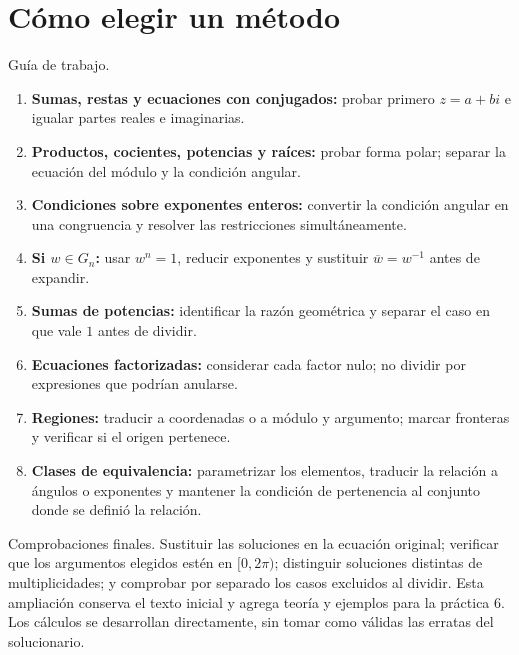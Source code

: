 \section{Cómo elegir un método}
\begin{nota}{Guía de trabajo.}
\begin{enumerate}
\item \textbf{Sumas, restas y ecuaciones con conjugados:} probar primero
$z=a+bi$ e igualar partes reales e imaginarias.
\item \textbf{Productos, cocientes, potencias y raíces:} probar forma polar;
separar la ecuación del módulo y la condición angular.
\item \textbf{Condiciones sobre exponentes enteros:} convertir la condición
angular en una congruencia y resolver las restricciones simultáneamente.
\item \textbf{Si $w\in G_n$:} usar $w^n=1$, reducir exponentes y sustituir
$\overline w=w^{-1}$ antes de expandir.
\item \textbf{Sumas de potencias:} identificar la razón geométrica y
separar el caso en que vale $1$ antes de dividir.
\item \textbf{Ecuaciones factorizadas:} considerar cada factor nulo;
no dividir por expresiones que podrían anularse.
\item \textbf{Regiones:} traducir a coordenadas o a módulo y argumento;
marcar fronteras y verificar si el origen pertenece.
\item \textbf{Clases de equivalencia:} parametrizar los elementos, traducir
la relación a ángulos o exponentes y mantener la condición de pertenencia
al conjunto donde se definió la relación.
\end{enumerate}
\end{nota}
\begin{nota}{Comprobaciones finales.}
Sustituir las soluciones en la ecuación original; verificar que los argumentos
elegidos estén en $[0,2\pi)$; distinguir soluciones distintas de multiplicidades;
y comprobar por separado los casos excluidos al dividir.
Esta ampliación conserva el texto inicial y agrega teoría y ejemplos para la
práctica 6. Los cálculos se desarrollan directamente, sin tomar como válidas
las erratas del solucionario.
\end{nota}